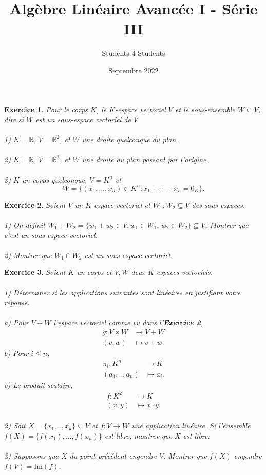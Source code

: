 \documentclass[11pt,french,table]{article}
\title{Algèbre Linéaire Avancée I - Série III}
\author{Students 4 Students}
\date{Septembre 2022}
\theoremstyle{exercice}
\newtheorem{exercice}{Exercice}
\newcommand{\R}{\mathbb{R}}
\begin{document}
\maketitle
\vspace{1em}
\begin{exercice}
Pour le corps $K$, le $K$-espace vectoriel $V$ et le sous-ensemble $W \subseteq V$, dire si $W$ est un sous-espace vectoriel de $V$. \\
\\
1) $K = \R$, $V = \R^2$, et $W$ une droite quelconque du plan. \\ \\
2) $K = \R$, $V = \R^2$, et $W$ une droite du plan passant par l'origine. \\ \\
3) $K$ un corps quelconque, $V = K^n$ et $$W = \{ (x_1,...,x_n) \in K^n : x_1 + \cdots + x_n = 0_K \}.$$
\end{exercice}
\vspace{2em}
\begin{exercice}
Soient $V$ un $K$-espace vectoriel et $W_1, W_2 \subseteq V$ des sous-espaces. \\ \\
\textnormal{1)} On définit $W_1 + W_2 = \{ w_1 + w_2 \in V : w_1 \in W_1, \, w_2 \in W_2 \} \subseteq V$. Montrer que c'est un sous-espace vectoriel. \\ \\
\textnormal{2)} Montrer que $W_1 \cap W_2$ est un sous-espace vectoriel.
\end{exercice}
\vspace{2em}
\begin{exercice}
Soient $K$ un corps et $V,W$ deux $K$-espaces vectoriels. \\ \\
1) Déterminez si les applications suivantes sont linéaires en justifiant votre réponse.
\\ \\
\indent a) Pour $V+W$ l'espace vectoriel comme vu dans l'\textbf{Exercice 2},
\begin{align*}
	g: V\times W &\longrightarrow V+W \\
	(v,w) &\longmapsto v+w
.\end{align*}
\indent b) Pour $i \leq n$,
\begin{align*}
	\pi_i: K^n &\longrightarrow K \\
	(a_1,..,a_n) &\longmapsto a_i.
\end{align*}
\indent c) Le produit scalaire,
\begin{align*}
	f : K^2 &\longrightarrow  K\\
	(x,y) &\longmapsto x \cdot y.
\end{align*} \\
2) Soit $X=\{x_1,..,x_k\} \subseteq V$ et $f:V \longrightarrow W$ une application linéaire. Si l'ensemble $f(X) = \{f(x_1),...,f(x_n) \}$ est libre, montrer que $X$ est libre. \\
\\
3) Supposons que $X$ du point précédent engendre $V$. Montrer que $f(X)$ engendre $f(V) = \text{Im}(f)$.
\end{exercice}
\end{document}
